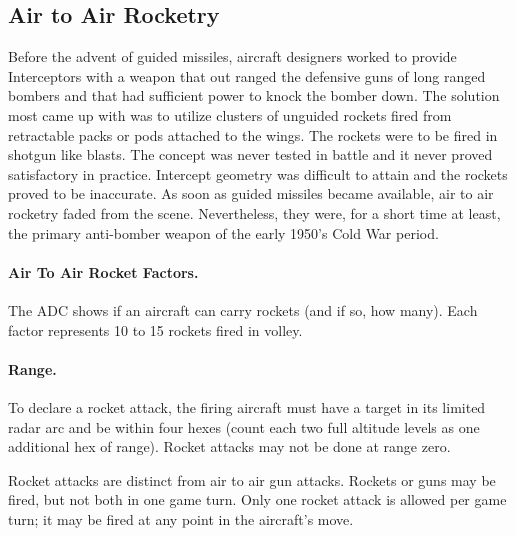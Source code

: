 

\advancedrules

\subsection{Air to Air Rocketry}


Before the advent of guided missiles, aircraft designers worked to provide Interceptors with a weapon that out ranged the defensive guns of long ranged bombers and that had sufficient power to knock the bomber down. The solution most came up with was to utilize clusters of unguided rockets fired from retractable packs or pods attached to the wings. The rockets were to be fired in shotgun like blasts. The concept was never tested in battle and it never proved satisfactory in practice. Intercept geometry was difficult to attain and the rockets proved to be inaccurate. As soon as guided missiles became available, air to air rocketry faded from the scene. Nevertheless, they were, for a short time at least, the primary anti-bomber weapon of the early 1950's Cold War period.

\paragraph{Air To Air Rocket Factors.} The ADC shows if an aircraft can carry rockets (and if so, how many). Each factor represents 10 to 15 rockets fired in volley.

\paragraph{Range.} To declare a rocket attack, the firing aircraft must have a target in its limited radar arc and be within four hexes (count each two full altitude levels as one additional hex of range). Rocket attacks may not be done at range zero.

Rocket attacks are distinct from air to air gun attacks. Rockets or guns may be fired, but not both in one game turn. Only one rocket attack is allowed per game turn; it may be fired at any point in the aircraft's move.

